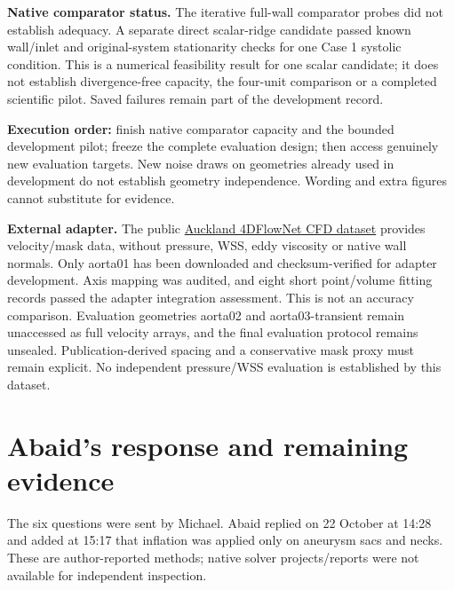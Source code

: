 \documentclass[11pt,a4paper]{article}
\begin{document}
\textbf{Native comparator status.} The iterative full-wall comparator probes did not establish adequacy. A separate direct scalar-ridge candidate passed known wall/inlet and original-system stationarity checks for one Case 1 systolic condition. This is a numerical feasibility result for one scalar candidate; it does not establish divergence-free capacity, the four-unit comparison or a completed scientific pilot. Saved failures remain part of the development record.

\textbf{Execution order:} finish native comparator capacity and the bounded development pilot; freeze the complete evaluation design; then access genuinely new evaluation targets. New noise draws on geometries already used in development do not establish geometry independence. Wording and extra figures cannot substitute for evidence.

\textbf{External adapter.} The public \href{https://auckland.figshare.com/articles/dataset/4DFlowNet_-_high_resolution_aortic_CFD_dataset/24424888}{Auckland 4DFlowNet CFD dataset} provides velocity/mask data, without pressure, WSS, eddy viscosity or native wall normals. Only aorta01 has been downloaded and checksum-verified for adapter development. Axis mapping was audited, and eight short point/volume fitting records passed the adapter integration assessment. This is not an accuracy comparison. Evaluation geometries aorta02 and aorta03-transient remain unaccessed as full velocity arrays, and the final evaluation protocol remains unsealed. Publication-derived spacing and a conservative mask proxy must remain explicit. No independent pressure/WSS evaluation is established by this dataset.

\section{Abaid's response and remaining evidence}

The six questions were sent by Michael. Abaid replied on 22 October at 14:28 and added at 15:17 that inflation was applied only on aneurysm sacs and necks. These are author-reported methods; native solver projects/reports were not available for independent inspection.
\end{document}
